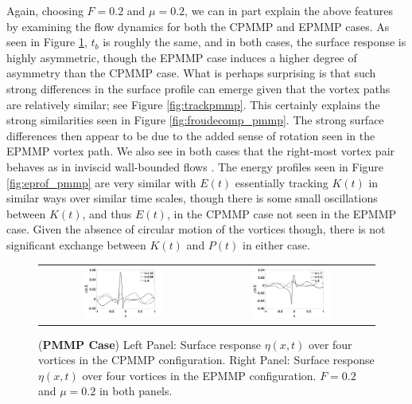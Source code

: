 \documentclass[a4paper,11pt]{article}
\begin{document}
Again, choosing $F=0.2$ and $\mu=0.2$, we can in part explain the above features by examining the flow dynamics for both the CPMMP and EPMMP cases.  As seen in Figure \ref{fig:surfreppmmp}, $t_{b}$ is roughly the same, and in both cases, the surface response is highly asymmetric, though the EPMMP case induces a higher degree of asymmetry than the CPMMP case.  What is perhaps surprising is that such strong differences in the surface profile can emerge given that the vortex paths are relatively similar; see Figure \ref{fig:trackpmmp}.  This certainly explains the strong similarities seen in Figure \ref{fig:froudecomp_pmmp}.  The strong surface differences then appear to be due to the added sense of rotation seen in the EPMMP vortex path.  We also see in both cases that the right-most vortex pair behaves as in inviscid wall-bounded flows \cite{lamb}.  The energy profiles seen in Figure \ref{fig:eprof_pmmp}     are very similar with $E(t)$ essentially tracking $K(t)$ in similar ways over similar time scales, though there is some small oscillations between $K(t)$, and thus $E(t)$, in the CPMMP case not seen in the EPMMP case. Given the absence of circular motion of the vortices though, there is not significant exchange between $K(t)$ and $P(t)$ in either case.   
\begin{figure}[!h]
\centering
\begin{tabular}{cc}
\includegraphics[width=0.5\textwidth]{surf_resp_mu_pt2_F_pt2_pmmp} & 
\includegraphics[width=0.5\textwidth]{surf_resp_mu_pt2_F_pt2_pmmp_sym}
\end{tabular}
\caption{\small ({\bf PMMP Case}) Left Panel: Surface response $\eta(x,t)$ over four vortices in the CPMMP configuration. Right Panel: Surface response $\eta(x,t)$ over four vortices in the EPMMP configuration.  $F=0.2$ and $\mu=0.2$ in both panels.}
\label{fig:surfreppmmp}
\end{figure}
\end{document}
